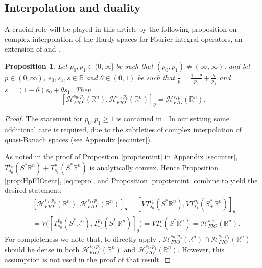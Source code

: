 \documentclass{amsart}
\newcommand {\HT}{\mathcal{H}}
\newcommand {\Hps}{\mathcal{H}^{s,p}_{FIO}(\Rn)}
\newcommand {\R}{\mathbb R}
\newcommand {\Rn}{\mathbb{R}^{n}}
\newcommand {\Sp}{S^{*}\Rn}
\newcommand {\Spp}{S^{*}_{+}\Rn}
\newtheorem{proposition}[theorem]{Proposition}
\theoremstyle{definition}
\numberwithin{equation}{section}
\begin{document}
\subsection{Interpolation and duality}\label{subsec:interdual}


A crucial role will be played in this article by the following proposition on complex interpolation of the Hardy spaces for Fourier integral operators, an extension of \cite[Proposition 6.7]{HaPoRo20} and \cite[Corollary 3.5]{Hassell-Rozendaal23}.

\begin{proposition}\label{prop:HpFIOint}
Let $p_{0},p_{1}\in(0,\infty]$ be such that $(p_{0},p_{1})\neq (\infty,\infty)$, and let $p\in(0,\infty)$, $s_{0},s_{1},s\in\R$ and $\theta\in(0,1)$ be such that $\frac{1}{p}=\frac{1-\theta}{p_{0}}+\frac{\theta}{p_{1}}$ and $s=(1-\theta)s_{0}+\theta s_{1}$. Then
\[
[\HT^{s_{0},p_{0}}_{FIO}(\Rn),\HT^{s_{1},p_{1}}_{FIO}(\Rn)]_{\theta}=\Hps.
\]
\end{proposition}
\begin{proof}
The statement for $p_{0},p_{1}\geq 1$ is contained in \cite[Corollary 3.5]{Hassell-Rozendaal23}. %
In our setting some additional care is required, due to the subtleties of complex interpolation of quasi-Banach spaces (see Appendix \ref{sec:inter}). 

As noted in the proof of Proposition \ref{prop:tentint} in Appendix \ref{sec:inter}, $T^{p_{0}}_{s_{0}}(\Sp)+T^{p_{1}}_{s_{1}}(\Sp)$ is analytically convex. %
Hence Proposition \ref{prop:HpFIOtent}, \eqref{eq:repro}, \cite[Lemma 7.11]{KaMaMi07} and Proposition \ref{prop:tentint} combine to yield the desired statement:
\begin{align*}
&[\HT^{s_{0},p_{0}}_{FIO}(\Rn),\HT^{s_{1},p_{1}}_{FIO}(\Rn)]_{\theta}=[VT_{s_{0}}^{p_{0}}(\Sp),VT_{s_{1}}^{p_{1}}(\Spp)]_{\theta}\\
&=V\big([T_{s_{0}}^{p_{0}}(\Sp),T_{s_{1}}^{p_{1}}(\Spp)]_{\theta}\big)=VT^{p}_{s}(\Sp)=\Hps.
\end{align*}
For completeness we note that, to directly apply \cite[Lemma 7.11]{KaMaMi07}, $\HT^{s_{0},p_{0}}_{FIO}(\Rn)\cap \HT^{s_{1},p_{1}}_{FIO}(\Rn)$ should be dense in both $\HT^{s_{0},p_{0}}_{FIO}(\Rn)$ and $\HT^{s_{1},p_{1}}_{FIO}(\Rn)$. However, this assumption is not used in the proof of that result.
\end{proof}
\end{document}
